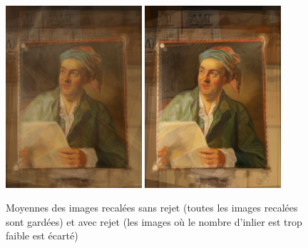 \documentclass[12pt,a4paper]{article}
\begin{document}
\begin{figure}[H]
  \centering
  \includegraphics[width=0.45\textwidth]{Fig/merge_no_rejection.png}
  \includegraphics[width=0.45\textwidth]{Fig/merge_rejection.png}
  \caption{Moyennes des images recalées sans rejet (toutes les images recalées sont gardées) et avec rejet (les images où le nombre d'inlier est trop faible est écarté)}
\end{figure}

\end{document}
